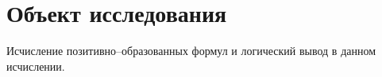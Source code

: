 







\section*{Объект исследования}
Исчисление позитивно--образованных формул и логический вывод в данном исчислении.


